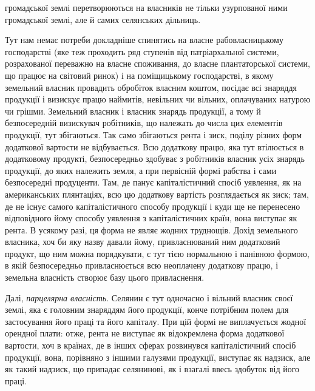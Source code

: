 \parcont{}  %
громадської землі перетворюються на власників не тільки узурпованої ними
громадської землі, але й самих селянських дільниць.

Тут нам немає потреби докладніше спинятись на власне рабовласницькому
господарстві (яке теж проходить ряд ступенів від патріархальної системи, розрахованої
переважно на власне споживання, до власне плантаторської системи,
що працює на світовий ринок) і на поміщицькому господарстві, в якому земельний
власник провадить обробіток власним коштом, посідає всі знаряддя
продукції і визискує працю наймитів, невільних чи вільних, оплачуваних натурою
чи грішми. Земельний власник і власник знарядь продукції, а тому й
безпосередній визискувач робітників, що належать до числа цих елементів продукції,
тут збігаються. Так само збігаються рента і зиск, поділу різних форм
додаткової вартости не відбувається. Всю додаткову працю, яка тут втілюється
в додатковому продукті, безпосередньо здобуває з робітників власник усіх знарядь
продукції, до яких належить земля, а при первісній формі рабства і сами
безпосередні продуценти. Там, де панує капіталістичний спосіб уявлення, як
на американських плянтаціях, всю цю додаткову вартість розглядається як зиск;
там, де не існує самого капіталістичного способу продукції і куди ще не перенесено
відповідного йому способу уявлення з капіталістичних країн, вона
виступає як рента. В усякому разі, ця форма не являє жодних труднощів. Дохід
земельного власника, хоч би яку назву давали йому, привласнюваний ним
додатковий продукт, що ним можна порядкувати, є тут тією нормальною і панівною
формою, в якій безпосередньо привласнюється всю неоплачену додаткову
працю, і земельна власність створює базу цього привласнення.

Далі, \emph{парцелярна власність}. Селянин є тут одночасно і вільний власник
своєї землі, яка є головним знаряддям його продукції, конче потрібним полем
для застосування його праці та його капіталу. При цій формі не виплачується
жодної орендної плати: отже, рента не виступає як відокремлена форма додаткової
вартости, хоч в країнах, де в інших сферах розвинувся капіталістичний
спосіб продукції, вона, порівняно з іншими галузями продукції, виступає як
надзиск, але як такий надзиск, що припадає селянинові, як і взагалі ввесь здобуток
від його праці.

